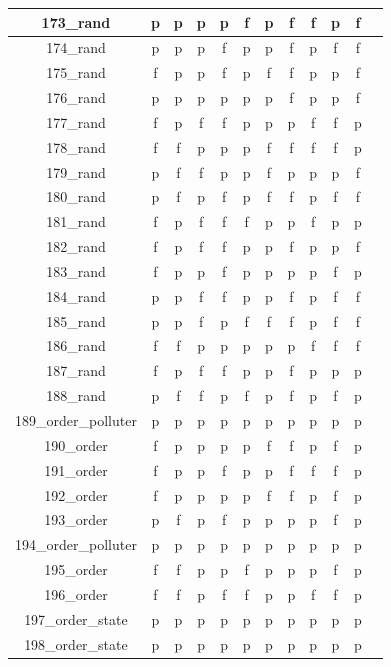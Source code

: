 \documentclass[
fancyheadings, %
%
%
]{stsreprt}
\begin{document}
\begin{longtable}{|c|c|c|c|c|c|c|c|c|c|c|c|}
\hline
173\_rand & p & p & p & p & f & p & f & f & p & f \\
\hline
174\_rand & p & p & p & f & p & p & f & p & f & f \\
\hline
175\_rand & f & p & p & f & p & f & f & p & p & f \\
\hline
176\_rand & p & p & p & p & p & p & f & p & p & f \\
\hline
177\_rand & f & p & f & f & p & p & p & f & f & p \\
\hline
178\_rand & f & f & p & p & p & f & f & f & f & p \\
\hline
179\_rand & p & f & f & p & p & f & p & p & p & f \\
\hline
180\_rand & p & f & p & f & p & f & f & p & f & f \\
\hline
181\_rand & f & p & f & f & f & p & p & f & p & p \\
\hline
182\_rand & f & p & f & f & p & p & f & p & p & f \\
\hline
183\_rand & f & p & p & f & p & p & p & p & f & p \\
\hline
184\_rand & p & p & f & f & p & p & f & p & f & f \\
\hline
185\_rand & p & p & f & p & f & f & f & p & f & f \\
\hline
186\_rand & f & f & p & p & p & p & p & f & f & f \\
\hline
187\_rand & f & p & f & f & p & p & f & p & p & p \\
\hline
188\_rand & p & f & f & p & f & p & f & p & f & p \\
\hline
189\_order\_polluter & p & p & p & p & p & p & p & p & p & p \\
\hline
190\_order & f & p & p & p & p & f & f & p & f & p \\
\hline
191\_order & f & p & p & f & p & p & f & f & f & p \\
\hline
192\_order & f & p & p & p & p & f & f & p & f & p \\
\hline
193\_order & p & f & p & f & p & p & p & p & f & p \\
\hline
194\_order\_polluter & p & p & p & p & p & p & p & p & p & p \\
\hline
195\_order & f & f & p & p & f & p & p & p & f & p \\
\hline
196\_order & f & f & p & f & f & p & p & f & f & p \\
\hline
197\_order\_state & p & p & p & p & p & p & p & p & p & p \\
\hline
198\_order\_state & p & p & p & p & p & p & p & p & p & p \\

\end{longtable}
\end{document}

